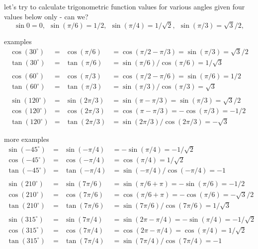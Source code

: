 \documentclass[17pt,landscape]{foils}
\begin{document}
{{\vitem
\eit



\bit
\item
	let's try to calculate trigonometric function values for various angles
	given four values below only - can we?
	\[
		\sin 0 = 0,
		\ \
		\sin(\pi/6) = 1/2,
		\ \
		\sin(\pi/4) = 1/\sqrt{2},
		\ \
		\sin(\pi/3) = \sqrt{3}/2,
	\]

\vitem
	examples
	\[
		\begin{array}{cccl}
			\cos (30^\circ) &=& \cos (\pi/6) &= \cos(\pi/2 - \pi/3) = \sin(\pi/3) = \sqrt{3}/2
			\\
			\tan (30^\circ) &=& \tan (\pi/6) &= \sin(\pi/6) / \cos(\pi/6) = 1/ \sqrt{3}
			\\
			\\
			\cos (60^\circ) &=& \cos (\pi/3) &= \cos(\pi/2 - \pi/6) = \sin(\pi/6) = {1}/2
			\\
			\tan (60^\circ) &=& \tan (\pi/3) &= \sin(\pi/3) / \cos(\pi/3) = \sqrt{3}
			\\
			\\
			\sin (120^\circ) &=& \sin(2\pi/3) &= \sin(\pi - \pi/3) = \sin(\pi/3) = \sqrt{3}/2
			\\
			\cos (120^\circ) &=& \cos(2\pi/3) &= \cos(\pi - \pi/3) = -\cos(\pi/3) = -1/2
			\\
			\tan (120^\circ) &=& \tan (2\pi/3) &= \sin(2\pi/3) / \cos(2\pi/3) = -\sqrt{3}
		\end{array}
	\]
\eit



\bit
\item
	more examples
	\[
		\begin{array}{cccl}
			\sin(-45^\circ ) &=&\sin(-\pi/4) &= - \sin(\pi/4) = - 1/\sqrt{2}
			\\
			\cos(-45^\circ ) &=&\cos(-\pi/4) &= \cos(\pi/4) = 1/\sqrt{2}
			\\
			\tan(-45^\circ) &=& \tan(-\pi/4) &= \sin(-\pi/4) / \cos(-\pi/4) = -1
			\\
			\\
			\sin(210^\circ ) &=&\sin(7\pi/6) &= \sin(\pi/6 + \pi) = -\sin(\pi/6) = - 1/{2}
			\\
			\cos(210^\circ ) &=&\cos(7\pi/6) &= \cos(\pi/6 + \pi) = -\cos(\pi/6) = - \sqrt{3}/{2}
			\\
			\tan(210^\circ) &=& \tan(7\pi/6) &= \sin(7\pi/6) / \cos(7\pi/6) = 1/\sqrt{3}
			\\
			\\
			\sin(315^\circ ) &=&\sin(7\pi/4) &= \sin(2\pi - \pi/4) = -\sin(\pi/4) = - 1/\sqrt{2}
			\\
			\cos(315^\circ ) &=&\cos(7\pi/4) &= \cos(2\pi - \pi/4) = \cos(\pi/4) = 1/\sqrt{2}
			\\
			\tan(315^\circ) &=& \tan(7\pi/4) &= \sin(7\pi/4) / \cos(7\pi/4) = -1
		\end{array}
	\]
\eit


}}
\end{document}
